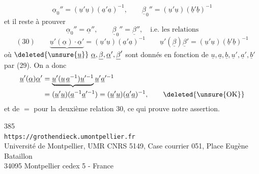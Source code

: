 \[
\underline\alpha_0''=(\underline u'\underline u)(\underline a'\underline a)^{-1},\qquad
\underline\beta_0''=(\underline u'\underline u)(\underline b'\underline b)^{-1}
\]
et il reste à prouver
\[
\underline\alpha_0''=\underline\alpha'',\qquad
\underline\beta_0''=\underline\beta'',\quad\text{i.e. les relations}
\]
\[
(30)\qquad
\underbrace{\underline u'(\underline\alpha)\cdot\underline\alpha'}
 =(\underline u'\underline u)(\underline a'\underline a)^{-1}
\qquad
\underline u'(\underline\beta)\underline\beta'
 =(\underline u'\underline u)(\underline b'\underline b)^{-1}
\]
où $\deleted{\unsure{\underline u}}\ \underline\alpha,\underline\beta,\underline\alpha',\underline\beta'$ sont donnés en fonction de  $\underline u,\underline a,\underline b,\underline u',\underline a',\underline b'$ par (29). On a donc
\[
\begin{aligned}
\underline u'(\underline\alpha)\underline\alpha'
 &=\underbrace{\underline u'(\underline u\,\underline a^{-1})\underline u'^{-1}}\underline u'\underline a'^{-1}\\
 &=(\underline u'\underline u)(\underline a^{-1}\underline a'^{-1})
 =(\underline u'\underline u)(\underline a'\underline a)^{-1},
 \qquad\deleted{\text{\unsure{OK}}}
\end{aligned}
\]
 et de $=$ pour la deuxième relation 30, ce qui prouve notre assertion.
\margin{$\unsure{\checkmark|/}$}

\begin{center}
385\\
\texttt{https://grothendieck.umontpellier.fr}\\
Université de Montpellier, UMR CNRS 5149, Case courrier 051, Place Eugène Bataillon\\
34095 Montpellier cedex 5 - France
\end{center}

